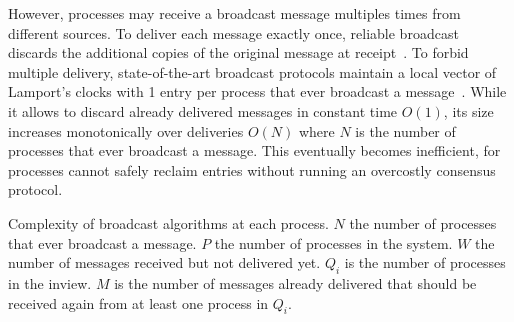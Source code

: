 However, processes may receive a broadcast message multiples times from
different sources.  To deliver each message exactly once, reliable broadcast
discards the additional copies of the original message at
receipt~\cite{hadzilacos1994modular}.  To forbid multiple delivery,
state-of-the-art broadcast protocols maintain a local vector of Lamport's clocks
with 1 entry per process that ever broadcast a
message~\cite{hadzilacos1994modular}. While it allows to discard already
delivered messages in constant time $O(1)$, its size increases monotonically
over deliveries $O(N)$ where $N$ is the number of processes that ever broadcast
a message. This eventually becomes inefficient, for processes cannot safely
reclaim entries without running an overcostly consensus protocol.




\begin{table}
  \begin{center}
    \caption{\label{table:complexity} Complexity of broadcast algorithms at each
      process. $N$ the number of processes that ever broadcast a message. $P$
      the number of processes in the system. $W$ the number of messages received
      but not delivered yet. $Q_i$ is the number of processes in the inview. $M$
      is the number of messages already delivered that should be received again
      from at least one process in $Q_i$.}
    
  \end{center}
\end{table}

